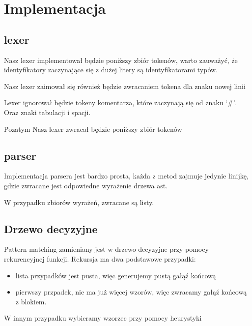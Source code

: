 \documentclass{article}
\begin{document}
\section{Implementacja}
\subsection{lexer}
Nasz lexer implementował będzie poniższy zbiór tokenów, warto zauważyć, że identyfikatory zaczynające się z dużej litery są identyfikatorami typów.

Nasz lexer zaimował się również będzie zwracaniem tokena dla znaku nowej linii

Lexer ignorował będzie tokeny komentarza, które zaczynają się od znaku `\#'. Oraz znaki tabulacji i spacji.
\newpage


Pozatym Nasz lexer zwracał będzie poniższy zbiór tokenów


\subsection{parser}
Implementacja parsera jest bardzo prosta, każda z metod zajmuje jedynie linijkę, gdzie zwracane jest odpowiedne wyrażenie drzewa ast.

W przypadku zbiorów wyrażeń, zwracane są listy.\newpage


\subsection{Drzewo decyzyjne}



Pattern matching zamieniany jest w drzewo decyzyjne przy pomocy rekurencyjnej funkcji.
Rekursja ma dwa podstawowe przypadki:
\begin{itemize}
  \item lista przypadków jest pusta, więc generujemy pustą gałąź końcową
  \item pierwszy przpadek, nie ma już więcej wzorów, więc zwracamy gałąź końcową z blokiem.
\end{itemize}

W innym przypadku wybieramy wzorzec przy pomocy heurystyki\newpage

\end{document}
